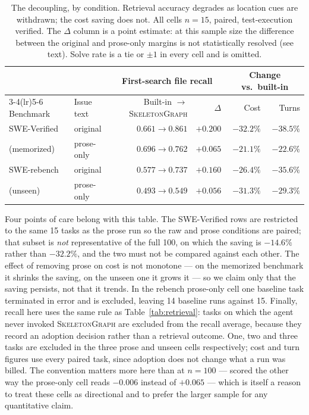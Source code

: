 \documentclass[11pt,letterpaper]{article}
\newcommand{\sg}{\textsc{SkeletonGraph}}
\begin{document}
\begin{table}[t]
\centering
\begin{tabular}{llrrrr}
\toprule
& & \multicolumn{2}{c}{First-search file recall} & \multicolumn{2}{c}{Change vs.\ built-in} \\
\cmidrule(lr){3-4}\cmidrule(lr){5-6}
Benchmark & Issue text & Built-in $\to$ \sg{} & $\Delta$ & Cost & Turns \\
\midrule
SWE-Verified   & original      & $0.661 \to 0.861$ & $+0.200$          & $-32.2\%$ & $-38.5\%$ \\
(memorized)    & prose-only    & $0.696 \to 0.762$ & $\mathbf{+0.065}$ & $-21.1\%$ & $-22.6\%$ \\
\addlinespace
SWE-rebench    & original      & $0.577 \to 0.737$ & $+0.160$          & $-26.4\%$ & $-35.6\%$ \\
(unseen)       & prose-only    & $0.493 \to 0.549$ & $\mathbf{+0.056}$ & $-31.3\%$ & $-29.3\%$ \\
\bottomrule
\end{tabular}
\caption{The decoupling, by condition. Retrieval accuracy degrades as location cues
are withdrawn; the cost saving does not. All cells $n=15$, paired, test-execution
verified. The $\Delta$ column is a point estimate: at this sample size the
difference between the original and prose-only margins is not statistically
resolved (see text). Solve rate is a tie or $\pm1$ in every cell and is omitted.}
\label{tab:grid}
\end{table}

Four points of care belong with this table. The SWE-Verified rows are restricted to
the same 15 tasks as the prose run so the raw and prose conditions are paired; that
subset is \emph{not} representative of the full 100, on which the saving is $-14.6\%$
rather than $-32.2\%$, and the two must not be compared against each other. The effect
of removing prose on cost is not monotone --- on the memorized benchmark it shrinks the
saving, on the unseen one it grows it --- so we claim only that the saving persists,
not that it trends. In the rebench prose-only cell one baseline task terminated in
error and is excluded, leaving 14 baseline runs against 15. Finally, recall here uses
the same rule as Table~\ref{tab:retrieval}: tasks on which the agent never invoked
\sg{} are excluded from the recall average, because they record an adoption decision
rather than a retrieval outcome. One, two and three tasks are excluded in the three
prose and unseen cells respectively; cost and turn figures use every paired task, since
adoption does not change what a run was billed. The convention matters more here than
at $n=100$ --- scored the other way the prose-only cell reads $-0.006$ instead of
$+0.065$ --- which is itself a reason to treat these cells as directional and to
prefer the larger sample for any quantitative claim.
\end{document}
